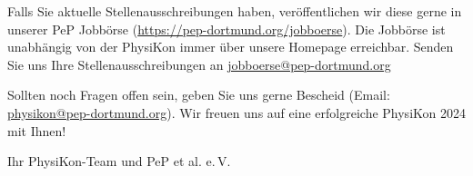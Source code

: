 \documentclass[
  paper=a4,
  fontsize=12pt,
  DIV=16,
  headheight=30pt,
  footheight=45pt,
  headinclude,
  parskip=half,
]{scrartcl}
\begin{document}
Falls Sie aktuelle Stellenausschreibungen haben, veröffentlichen wir diese gerne in unserer PeP Jobbörse (\url{https://pep-dortmund.org/jobboerse}).
Die Jobbörse ist unabhängig von der PhysiKon immer über unsere Homepage erreichbar.
Senden Sie uns Ihre Stellenausschreibungen an \href{mailto:jobboerse@pep-dortmund.org}{jobboerse@pep-dortmund.org}

\vspace{0.5cm}

Sollten noch Fragen offen sein, geben Sie uns gerne Bescheid (Email: \href{mailto:physikon@pep-dortmund.org}{physikon@pep-dortmund.org}).
Wir freuen uns auf eine erfolgreiche PhysiKon 2024 mit Ihnen!

Ihr PhysiKon-Team und PeP et al. e.\,V.
\end{document}
